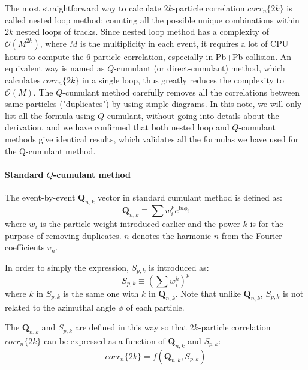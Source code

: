 The most straightforward way to calculate $2k$-particle correlation $corr_n\{2k\}$ is called nested loop method: counting all the possible unique combinations within $2k$ nested loops of tracks. Since nested loop method has a complexity of $\mathcal{O}(M^{2k})$, where $M$ is the multiplicity in each event, it requires a lot of CPU hours to compute the 6-particle correlation, especially in Pb+Pb collision. An equivalent way is named as $Q$-cumulant (or direct-cumulant) method, which calculates $corr_n\{2k\}$ in a single loop, thus greatly reduces the complexity to $\mathcal{O}(M)$. The $Q$-cumulant method carefully removes all the correlations between same particles ("duplicates") by using simple diagrams. In this note, we will only list all the formula using $Q$-cumulant, without going into details about the derivation, and we have confirmed that both nested loop and $Q$-cumulant methods give identical results, which validates all the formulas we have used for the Q-cumulant method.



\paragraph{Standard $Q$-cumulant method}
The event-by-event $\pmb{Q}_{n,k}$ vector in standard cumulant method is defined as:
\begin{equation}
\pmb{Q}_{n,k}\equiv\sum{w_i^k e^{\text{i}n\phi_i}}
\end{equation}
where $w_i$ is the particle weight introduced earlier and the power $k$ is for the purpose of removing duplicates. $n$ denotes the harmonic $n$ from the Fourier coefficients $v_n$.

In order to simply the expression, $S_{p,k}$ is introduced as:
\begin{equation}
S_{p,k}\equiv(\sum{w_i^k})^{p}
\end{equation}
where $k$ in $S_{p,k}$ is the same one with $k$ in $\pmb{Q}_{n,k}$. Note that unlike $\pmb{Q}_{n,k}$, $S_{p,k}$ is not related to the azimuthal angle $\phi$ of each particle.

The $\pmb{Q}_{n,k}$ and $S_{p,k}$ are defined in this way so that $2k$-particle correlation $corr_n\{2k\}$ can be expressed as a function of $\pmb{Q}_{n,k}$ and $S_{p,k}$:
\begin{equation}
corr_n\{2k\}=f(\pmb{Q}_{n,k},S_{p,k})
\end{equation}

